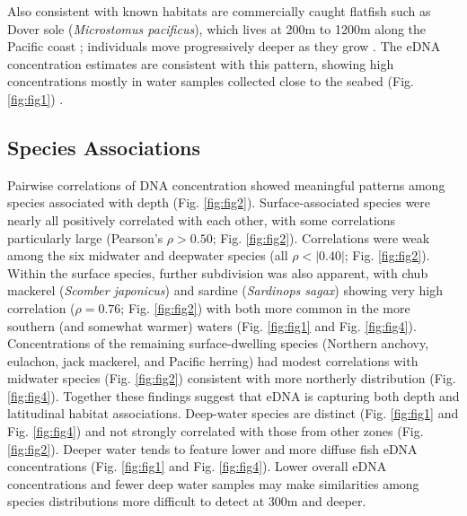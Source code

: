 \documentclass{article}
\begin{document}
Also consistent with known habitats are commercially caught flatfish such as Dover sole (\textit{Microstomus pacificus}), which lives at 200m to 1200m along the Pacific coast \cite{drazen2007,brodziak2000,drazen2012}; individuals move progressively deeper as they grow \cite{vetter1994,hunter1990}. The eDNA concentration estimates are consistent with this pattern, showing high concentrations mostly in water samples collected close to the seabed (Fig. \ref{fig:fig1}) \cite{ono2016}.

\subsection*{Species Associations}

Pairwise correlations of DNA concentration showed meaningful patterns among species associated with depth (Fig. \ref{fig:fig2}). Surface-associated species were nearly all positively correlated with each other, with some correlations particularly large (Pearson's $\rho > 0.50$; Fig. \ref{fig:fig2}). Correlations were weak among the six midwater and deepwater species (all $\rho < |0.40|$; Fig. \ref{fig:fig2}). Within the surface species, further subdivision was also apparent, with chub mackerel (\textit{Scomber japonicus}) and sardine (\textit{Sardinops sagax}) showing very high correlation ($\rho = 0.76$; Fig. \ref{fig:fig2}) with both more common in the more southern (and somewhat warmer) waters (Fig. \ref{fig:fig1} and Fig. \ref{fig:fig4}). Concentrations of the remaining surface-dwelling species (Northern anchovy, eulachon, jack mackerel, and Pacific herring) had modest correlations with midwater species (Fig. \ref{fig:fig2}) consistent with more northerly distribution (Fig. \ref{fig:fig4}). Together these findings suggest that eDNA is capturing both depth and latitudinal habitat associations. Deep-water species are distinct (Fig. \ref{fig:fig1} and Fig. \ref{fig:fig4}) and not strongly correlated with those from other zones (Fig. \ref{fig:fig2}). Deeper water tends to feature lower and more diffuse fish eDNA concentrations (Fig. \ref{fig:fig1} and Fig. \ref{fig:fig4}). Lower overall eDNA concentrations and fewer deep water samples may make similarities among species distributions more difficult to detect at 300m and deeper.
\end{document}
